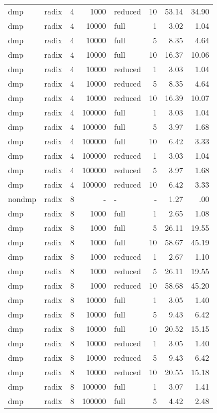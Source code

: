 \begin{center}
\begin{small}
\begin{longtable}{llrrlrrr}
dmp & radix & 4 & 1000 & reduced & 10 & 53.14 & 34.90\\
dmp & radix & 4 & 10000 & full & 1 & 3.02 & 1.04\\
dmp & radix & 4 & 10000 & full & 5 & 8.35 & 4.64\\
dmp & radix & 4 & 10000 & full & 10 & 16.37 & 10.06\\
dmp & radix & 4 & 10000 & reduced & 1 & 3.03 & 1.04\\
dmp & radix & 4 & 10000 & reduced & 5 & 8.35 & 4.64\\
dmp & radix & 4 & 10000 & reduced & 10 & 16.39 & 10.07\\
dmp & radix & 4 & 100000 & full & 1 & 3.03 & 1.04\\
dmp & radix & 4 & 100000 & full & 5 & 3.97 & 1.68\\
dmp & radix & 4 & 100000 & full & 10 & 6.42 & 3.33\\
dmp & radix & 4 & 100000 & reduced & 1 & 3.03 & 1.04\\
dmp & radix & 4 & 100000 & reduced & 5 & 3.97 & 1.68\\
dmp & radix & 4 & 100000 & reduced & 10 & 6.42 & 3.33\\
\hline
nondmp & radix & 8 & - & - & - & 1.27 & .00\\
dmp & radix & 8 & 1000 & full & 1 & 2.65 & 1.08\\
dmp & radix & 8 & 1000 & full & 5 & 26.11 & 19.55\\
dmp & radix & 8 & 1000 & full & 10 & 58.67 & 45.19\\
dmp & radix & 8 & 1000 & reduced & 1 & 2.67 & 1.10\\
dmp & radix & 8 & 1000 & reduced & 5 & 26.11 & 19.55\\
dmp & radix & 8 & 1000 & reduced & 10 & 58.68 & 45.20\\
dmp & radix & 8 & 10000 & full & 1 & 3.05 & 1.40\\
dmp & radix & 8 & 10000 & full & 5 & 9.43 & 6.42\\
dmp & radix & 8 & 10000 & full & 10 & 20.52 & 15.15\\
dmp & radix & 8 & 10000 & reduced & 1 & 3.05 & 1.40\\
dmp & radix & 8 & 10000 & reduced & 5 & 9.43 & 6.42\\
dmp & radix & 8 & 10000 & reduced & 10 & 20.55 & 15.18\\
dmp & radix & 8 & 100000 & full & 1 & 3.07 & 1.41\\
dmp & radix & 8 & 100000 & full & 5 & 4.42 & 2.48\\

\end{longtable}
\end{small}
\end{center}
